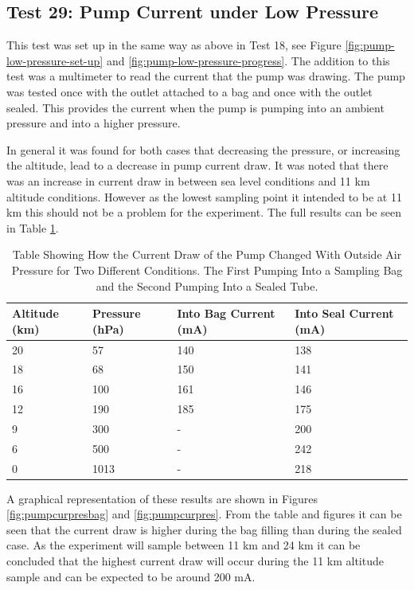 \documentclass[a4paper,12pt,oneside]{article} %
\begin{document}
\begin{appendices}
\subsection{Test 29: Pump Current under Low Pressure}
\label{sec:test29result}

This test was set up in the same way as above in Test 18, see Figure \ref{fig:pump-low-pressure-set-up} and \ref{fig:pump-low-pressure-progress}. The addition to this test was a multimeter to read the current that the pump was drawing. The pump was tested once with the outlet attached to a bag and once with the outlet sealed. This provides the current when the pump is pumping into an ambient pressure and into a higher pressure.

In general it was found for both cases that decreasing the pressure, or increasing the altitude, lead to a decrease in pump current draw. It was noted that there was an increase in current draw in between sea level conditions and 11 km altitude conditions. However as the lowest sampling point it intended to be at 11 km this should not be a problem for the experiment. The full results can be seen in Table \ref{tab:pumpcurrentpressure}. 

\begin{table}[H]
\centering

\begin{tabular}{|l|l|l|l|}
\hline
\textbf{Altitude (km)} & \textbf{Pressure (hPa)} & \textbf{Into Bag Current (mA)} & \textbf{Into Seal Current (mA)} \\ \hline
20 & 57 & 140 & 138 \\ \hline
18 & 68 & 150 & 141 \\ \hline
16 & 100 & 161 & 146 \\ \hline
12 & 190 & 185 & 175 \\ \hline
9 & 300 & - & 200 \\ \hline
6 & 500 & - & 242 \\ \hline
0 & 1013 & - & 218 \\ \hline
\end{tabular}
\caption{Table Showing How the Current Draw of the Pump Changed With Outside Air Pressure for Two Different Conditions. The First Pumping Into a Sampling Bag and the Second Pumping Into a Sealed Tube.}
\label{tab:pumpcurrentpressure}
\end{table}

A graphical representation of these results are shown in Figures \ref{fig:pumpcurpresbag} and \ref{fig:pumpcurpres}. From the table and figures it can be seen that the current draw is higher during the bag filling than during the sealed case. As the experiment will sample between 11 km and 24 km it can be concluded that the highest current draw will occur during the 11 km altitude sample and can be expected to be around 200 mA. 


\end{appendices}
\end{document}
